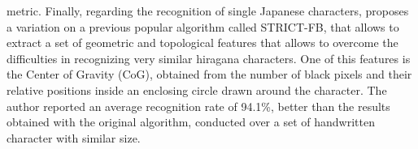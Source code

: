 metric. Finally, regarding the recognition of single Japanese characters, \cite{School_of_Engineering_Technology_West_Bengal_University_of_Technology_India2014-wb} proposes a variation on a previous popular algorithm called STRICT-FB, that allows to extract a set of geometric and topological features that allows to overcome the difficulties in recognizing very similar hiragana characters. One of this features is the Center of Gravity (CoG), obtained from the number of black pixels and their relative positions inside an enclosing circle drawn around the character. The author reported an average recognition rate of 94.1\%, better than the results obtained with the original algorithm, conducted over a set of handwritten character with similar size.